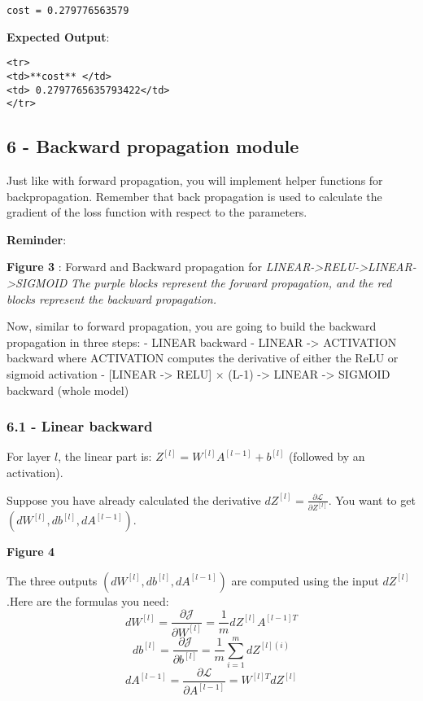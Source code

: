 \documentclass[11pt]{article}
\begin{document}
    \begin{Verbatim}[commandchars=\\\{\}]
cost = 0.279776563579

    \end{Verbatim}

    \textbf{Expected Output}:

\begin{verbatim}
<tr>
<td>**cost** </td>
<td> 0.2797765635793422</td> 
</tr>
\end{verbatim}

    \subsection{6 - Backward propagation
module}\label{backward-propagation-module}

Just like with forward propagation, you will implement helper functions
for backpropagation. Remember that back propagation is used to calculate
the gradient of the loss function with respect to the parameters.

\textbf{Reminder}:

\textbf{Figure 3} : Forward and Backward propagation for
\emph{LINEAR-\textgreater{}RELU-\textgreater{}LINEAR-\textgreater{}SIGMOID}
\emph{The purple blocks represent the forward propagation, and the red
blocks represent the backward propagation.}

Now, similar to forward propagation, you are going to build the backward
propagation in three steps: - LINEAR backward - LINEAR -\textgreater{}
ACTIVATION backward where ACTIVATION computes the derivative of either
the ReLU or sigmoid activation - {[}LINEAR -\textgreater{} RELU{]}
$\times$ (L-1) -\textgreater{} LINEAR -\textgreater{} SIGMOID backward
(whole model)

    \subsubsection{6.1 - Linear backward}\label{linear-backward}

For layer $l$, the linear part is:
$Z^{[l]} = W^{[l]} A^{[l-1]} + b^{[l]}$ (followed by an activation).

Suppose you have already calculated the derivative
$dZ^{[l]} = \frac{\partial \mathcal{L} }{\partial Z^{[l]}}$. You want to
get $(dW^{[l]}, db^{[l]}, dA^{[l-1]})$.

\textbf{Figure 4}

The three outputs $(dW^{[l]}, db^{[l]}, dA^{[l-1]})$ are computed using
the input $dZ^{[l]}$.Here are the formulas you need:
\[ dW^{[l]} = \frac{\partial \mathcal{J} }{\partial W^{[l]}} = \frac{1}{m} dZ^{[l]} A^{[l-1] T} \tag{8}\]
\[ db^{[l]} = \frac{\partial \mathcal{J} }{\partial b^{[l]}} = \frac{1}{m} \sum_{i = 1}^{m} dZ^{[l](i)}\tag{9}\]
\[ dA^{[l-1]} = \frac{\partial \mathcal{L} }{\partial A^{[l-1]}} = W^{[l] T} dZ^{[l]} \tag{10}\]
\end{document}
